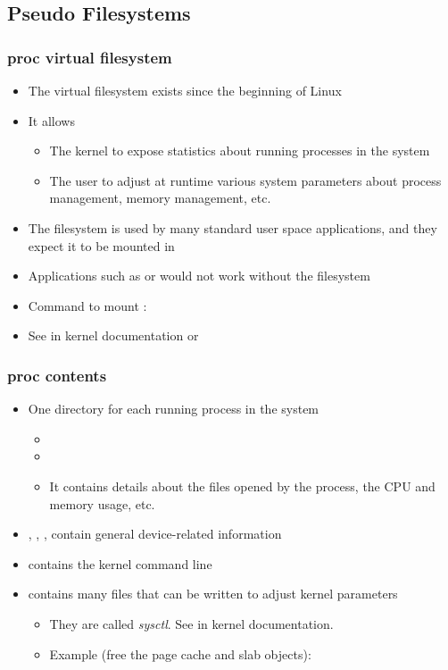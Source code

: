 \subsection{Pseudo Filesystems}
\begin{frame}
  \frametitle{proc virtual filesystem}
  \begin{itemize}
  \item The  virtual filesystem exists since the beginning of
    Linux
  \item It allows
    \begin{itemize}
    \item The kernel to expose statistics about running processes in
      the system
    \item The user to adjust at runtime various system parameters
      about process management, memory management, etc.
    \end{itemize}
  \item The  filesystem is used by many standard user space
    applications, and they expect it to be mounted in 
  \item Applications such as  or  would not work
    without the  filesystem
  \item Command to mount :\\
  \item See  in kernel documentation
        or 
  \end{itemize}
\end{frame}

\begin{frame}
  \frametitle{proc contents}
  \begin{itemize}
  \item One directory for each running process in the system
    \begin{itemize}
    \item {}
    \item {}
    \item It contains details about the files opened by the process,
      the CPU and memory usage, etc.
    \end{itemize}
  \item {}, ,
    , contain general device-related information
  \item {} contains the kernel command line
  \item {} contains many files that can be written to
    adjust kernel parameters
    \begin{itemize}
    \item They are called {\em sysctl}. See 
      in kernel documentation.
    \item Example (free the page cache and slab objects):\\
    \end{itemize}
  \end{itemize}
\end{frame}

